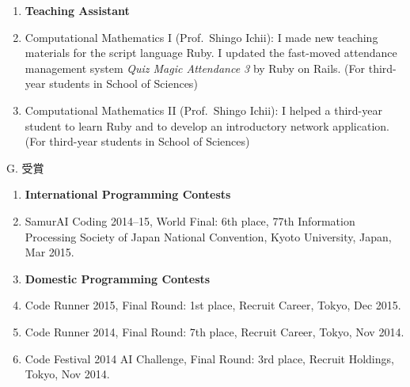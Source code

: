 \documentclass[a4j,twocolumn]{jarticle}
\begin{document}

\begin{enumerate}
\item[] {\bf Teaching Assistant}
\item Computational Mathematics I (Prof.~Shingo Ichii):
I made new teaching materials for the script language Ruby.
I updated the fast-moved attendance management system
{\it Quiz Magic Attendance 3} by Ruby on Rails. 
(For third-year students in School of Sciences)
\item Computational Mathematics II (Prof.~Shingo Ichii): 
I helped a third-year student to learn Ruby and
to develop an introductory network application.
(For third-year students in School of Sciences)
\end{enumerate}

\vspace{0.2cm}
\noindent
G. 受賞

\begin{enumerate}
 \item[] {\bf International Programming Contests}
 \item SamurAI Coding 2014--15, World Final: 6th place, 77th Information
       Processing Society of Japan National Convention, Kyoto
       University, Japan, Mar 2015.
 \item[] {\bf Domestic Programming Contests}
 \item Code Runner 2015, Final Round: 1st place,
       Recruit Career, Tokyo, Dec 2015.
 \item Code Runner 2014, Final Round: 7th place,
       Recruit Career, Tokyo, Nov 2014.
 \item Code Festival 2014 AI Challenge, Final Round: 3rd place,
       Recruit Holdings, Tokyo, Nov 2014.
\end{enumerate}

\vspace{0.1cm}
\end{document}
